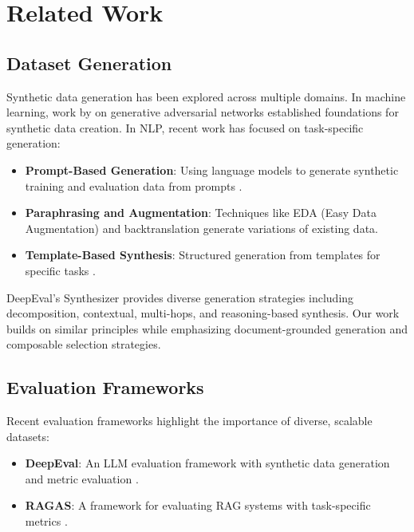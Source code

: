 \documentclass[11pt,a4paper]{article}
\begin{document}
\section{Related Work}

\subsection{Dataset Generation}

Synthetic data generation has been explored across multiple domains. In machine learning, work by \cite{goodfellow2014generative} on generative adversarial networks established foundations for synthetic data creation. In NLP, recent work has focused on task-specific generation:

\begin{itemize}
    \item \textbf{Prompt-Based Generation}: Using language models to generate synthetic training and evaluation data from prompts \cite{karimi2021aeda, yuan2020bartscore}.

    \item \textbf{Paraphrasing and Augmentation}: Techniques like EDA (Easy Data Augmentation) \cite{wei2019eda} and backtranslation \cite{sennrich2015improving} generate variations of existing data.

    \item \textbf{Template-Based Synthesis}: Structured generation from templates for specific tasks \cite{wang2018glue}.
\end{itemize}

DeepEval's Synthesizer \cite{deepeval2024} provides diverse generation strategies including decomposition, contextual, multi-hops, and reasoning-based synthesis. Our work builds on similar principles while emphasizing document-grounded generation and composable selection strategies.

\subsection{Evaluation Frameworks}

Recent evaluation frameworks highlight the importance of diverse, scalable datasets:

\begin{itemize}
    \item \textbf{DeepEval}: An LLM evaluation framework with synthetic data generation and metric evaluation \cite{deepeval2024}.

    \item \textbf{RAGAS}: A framework for evaluating RAG systems with task-specific metrics \cite{ragas2024}.
\end{itemize}
\end{document}
